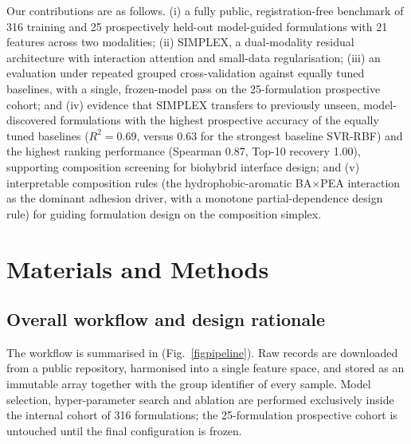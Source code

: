 \documentclass[utf8]{FrontiersinHarvard}
\newcommand{\Fref}[2]{Fig.~\hyperref[#1]{\ref{#1}#2}}
\begin{document}
Our contributions are as follows. (i) a fully public, registration-free benchmark of 316 training and 25 prospectively held-out model-guided formulations with 21 features across two modalities; (ii) SIMPLEX, a dual-modality residual architecture with interaction attention and small-data regularisation; (iii) an evaluation under repeated grouped cross-validation against equally tuned baselines, with a single, frozen-model pass on the 25-formulation prospective cohort; and (iv) evidence that SIMPLEX transfers to previously unseen, model-discovered formulations with the highest prospective accuracy of the equally tuned baselines ($R^2 = 0.69$, versus 0.63 for the strongest baseline SVR-RBF) and the highest ranking performance (Spearman $0.87$, Top-10 recovery 1.00), supporting composition screening for biohybrid interface design; and (v) interpretable composition rules (the hydrophobic-aromatic BA$\times$PEA interaction as the dominant adhesion driver, with a monotone partial-dependence design rule) for guiding formulation design on the composition simplex.

\section{Materials and Methods}

\subsection{Overall workflow and design rationale}

The workflow is summarised in (\Fref{figpipeline}{}). Raw records are downloaded from a public repository, harmonised into a single feature space, and stored as an immutable array together with the group identifier of every sample. Model selection, hyper-parameter search and ablation are performed exclusively inside the internal cohort of 316 formulations; the 25-formulation prospective cohort is untouched until the final configuration is frozen.
\end{document}
